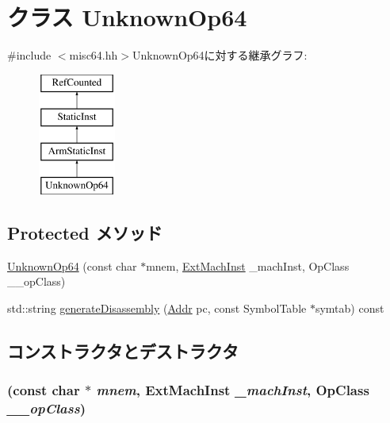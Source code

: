 \hypertarget{classUnknownOp64}{
\section{クラス UnknownOp64}
\label{classUnknownOp64}
}


{\ttfamily \#include $<$misc64.hh$>$}UnknownOp64に対する継承グラフ:\begin{figure}[H]
\begin{center}
\leavevmode
\includegraphics[height=4cm]{classUnknownOp64}
\end{center}
\end{figure}
\subsection*{Protected メソッド}
\begin{DoxyCompactItemize}
\item 
\hyperlink{classUnknownOp64_aabef19b01a5860d5a6b2e07dfc6b3e1b}{UnknownOp64} (const char $\ast$mnem, \hyperlink{classStaticInst_a5605d4fc727eae9e595325c90c0ec108}{ExtMachInst} \_\-machInst, OpClass \_\-\_\-opClass)
\item 
std::string \hyperlink{classUnknownOp64_a95d323a22a5f07e14d6b4c9385a91896}{generateDisassembly} (\hyperlink{classm5_1_1params_1_1Addr}{Addr} pc, const SymbolTable $\ast$symtab) const 
\end{DoxyCompactItemize}


\subsection{コンストラクタとデストラクタ}
\hypertarget{classUnknownOp64_aabef19b01a5860d5a6b2e07dfc6b3e1b}{
\subsubsection[{UnknownOp64}]{ (const char $\ast$ {\em mnem}, \/  {\bf ExtMachInst} {\em \_\-machInst}, \/  OpClass {\em \_\-\_\-opClass})}}
\label{classUnknownOp64_aabef19b01a5860d5a6b2e07dfc6b3e1b}



